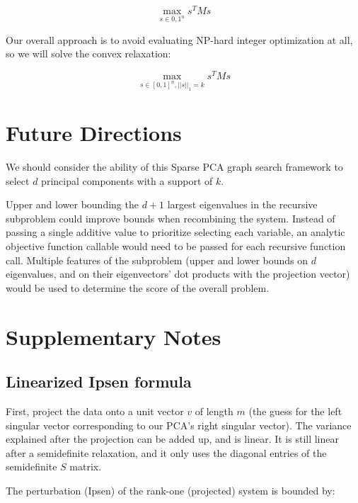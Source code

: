 \documentclass{article}
\begin{document}
$$
\max_{s \in {0,1}^n} s^T M s
$$

Our overall approach is to avoid evaluating NP-hard integer optimization at all, so we will solve the convex relaxation:

$$
\max_{s \in [0,1]^n, ||s||_1 = k} s^T M s
$$

\section{Future Directions}

We should consider the ability of this Sparse PCA graph search framework to select $d$ principal components with a support of $k$.


Upper and lower bounding the $d+1$ largest eigenvalues in the recursive subproblem could improve bounds when recombining the system. Instead of passing a single additive value to prioritize selecting each variable, an analytic objective function callable would need to be passed for each recursive function call. Multiple features of the subproblem (upper and lower bounds on $d$ eigenvalues, and on their eigenvectors' dot products with the projection vector) would be used to determine the score of the overall problem.

\section{Supplementary Notes}

\subsection{Linearized Ipsen formula}

First, project the data onto a unit vector $v$ of length $m$ (the guess for the left singular vector corresponding to our PCA's right singular vector). The variance explained after the projection can be added up, and is linear. It is still linear after a semidefinite relaxation, and it only uses the diagonal entries of the semidefinite $S$ matrix.

The perturbation (Ipsen) of the rank-one (projected) system is bounded by:
\end{document}
